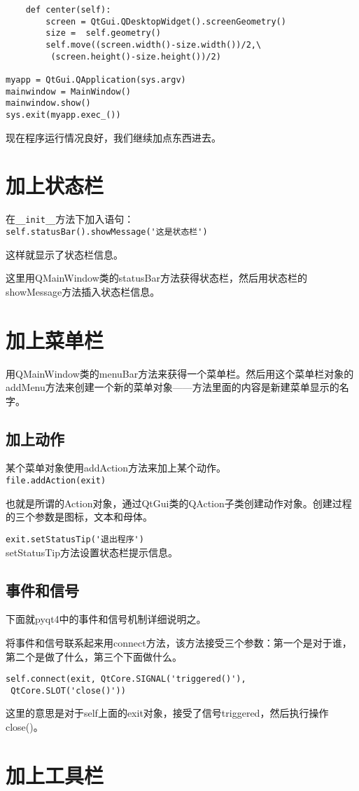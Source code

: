 \documentclass[12pt,oneside]{book}
\begin{document}
\begin{common-format}
\begin{Verbatim}
    def center(self):
        screen = QtGui.QDesktopWidget().screenGeometry()
        size =  self.geometry()
        self.move((screen.width()-size.width())/2,\
         (screen.height()-size.height())/2)

myapp = QtGui.QApplication(sys.argv)
mainwindow = MainWindow()
mainwindow.show()
sys.exit(myapp.exec_())
\end{Verbatim}

现在程序运行情况良好，我们继续加点东西进去。


\section{加上状态栏}
在\verb+__init__+方法下加入语句：\\
\verb+self.statusBar().showMessage('这是状态栏')+

这样就显示了状态栏信息。

这里用QMainWindow类的statusBar方法获得状态栏，然后用状态栏的showMessage方法插入状态栏信息。


\section{加上菜单栏}
用QMainWindow类的menuBar方法来获得一个菜单栏。然后用这个菜单栏对象的addMenu方法来创建一个新的菜单对象——方法里面的内容是新建菜单显示的名字。

\subsection{加上动作}
某个菜单对象使用addAction方法来加上某个动作。\\
\verb+file.addAction(exit)+


也就是所谓的Action对象，通过QtGui类的QAction子类创建动作对象。创建过程的三个参数是图标，文本和母体。

\verb+exit.setStatusTip('退出程序')+\\
setStatusTip方法设置状态栏提示信息。


\subsection{事件和信号}
下面就pyqt4中的事件和信号机制详细说明之。

将事件和信号联系起来用connect方法，该方法接受三个参数：第一个是对于谁，第二个是做了什么，第三个下面做什么。

\begin{Verbatim}
self.connect(exit, QtCore.SIGNAL('triggered()'),
 QtCore.SLOT('close()'))
\end{Verbatim}

这里的意思是对于self上面的exit对象，接受了信号triggered，然后执行操作close()。


\section{加上工具栏}






\end{common-format}
\end{document}
